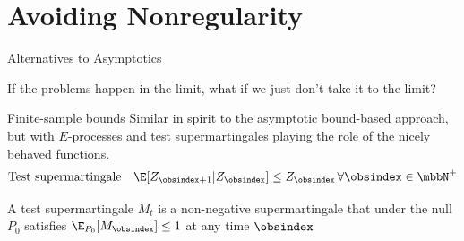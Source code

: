 \documentclass[aspectratio=169, professionalfonts]{beamer}
\newcommand{\prode}[2]{E_{#1}^{#2}}
\begin{document}



\section{Avoiding Nonregularity}
\begin{frame}{Alternatives to Asymptotics}
	\vfill

	If the problems happen in the limit, what if we just don't take it to the limit?

	\vfill
\end{frame}

\begin{frame}{Finite-sample bounds}
	Similar in spirit to the asymptotic bound-based approach, but with
	$E$-processes and test	supermartingales playing the role of the nicely behaved functions.
	\vfill
	\[\text{Test supermartingale} \quad \E[Z_{\obsindex + 1} | Z_{\obsindex}] \leq
		Z_{\obsindex} \, \forall \obsindex \in \mbbN^+ \]

	\vfill \pause

	A test supermartingale $M_t$ is a non-negative supermartingale that under
	the null $P_0$ satisfies $\E_{P_0}[M_\obsindex] \leq 1$ at any time $\obsindex$



\end{frame}


\end{document}
